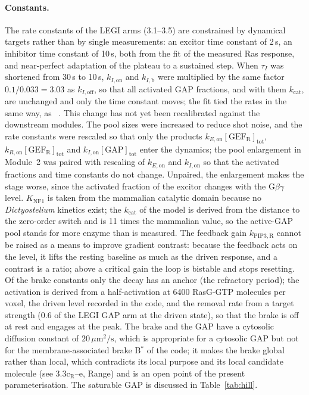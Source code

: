 \paragraph{Constants.}
The rate constants of the LEGI arms (3.1--3.5) are constrained by dynamical targets rather than by single measurements: an excitor time constant of 2\,s, an inhibitor time constant of 10\,s, both from the fit of the measured Ras response, and near-perfect adaptation of the plateau to a sustained step.
When $\tau_I$ was shortened from 30\,s to 10\,s, $k_{I,\mathrm{on}}$ and $k_{I,\mathrm{b}}$ were multiplied by the same factor $0.1/0.033=3.03$ as $k_{I,\mathrm{off}}$, so that all activated GAP fractions, and with them $k_\mathrm{cat}$, are unchanged and only the time constant moves; the fit tied the rates in the same way, as ~\cite[Suppl.\ Information]{takeda2012}. This change has not yet been recalibrated against the downstream modules.
The pool sizes were increased to reduce shot noise, and the rate constants were rescaled so that only the products $k_{E,\mathrm{on}}[\mathrm{GEF_R}]_\mathrm{tot}$, $k_{R,\mathrm{on}}[\mathrm{GEF_R}]_\mathrm{tot}$ and $k_{I,\mathrm{on}}[\mathrm{GAP}]_\mathrm{tot}$ enter the dynamics; the pool enlargement in Module~2 was paired with rescaling of $k_{E,\mathrm{on}}$ and $k_{I,\mathrm{on}}$ so that the activated fractions and time constants do not change.
Unpaired, the enlargement makes the stage worse, since the activated fraction of the excitor changes with the G$\beta\gamma$ level.
$K_\mathrm{NF1}$ is taken from the mammalian catalytic domain because no \emph{Dictyostelium} kinetics exist; the $k_\mathrm{cat}$ of the model is derived from the distance to the zero-order switch and is 11 times the mammalian value, so the active-GAP pool stands for more enzyme than is measured.
The feedback gain $k_\mathrm{PIP3,R}$ cannot be raised as a means to improve gradient contrast: because the feedback acts on the level, it lifts the resting baseline as much as the driven response, and a contrast is a ratio; above a critical gain the loop is bistable and stops resetting.
Of the brake constants only the decay has an anchor (the refractory period); the activation is derived from a half-activation at 6400 RasG-GTP molecules per voxel, the driven level recorded in the code, and the removal rate from a target strength (0.6 of the LEGI GAP arm at the driven state), so that the brake is off at rest and engages at the peak.
The brake and the GAP have a cytosolic diffusion constant of $20\,\mu\mathrm{m^2/s}$, which is appropriate for a cytosolic GAP but not for the membrane-associated brake B$^*$ of the code; it makes the brake global rather than local, which contradicts its local purpose and its local candidate molecule (see 3.3c$_\mathrm{R}$--e, Range) and is an open point of the present parameterisation.
The saturable GAP is discussed in Table~\ref{tab:hill}.
